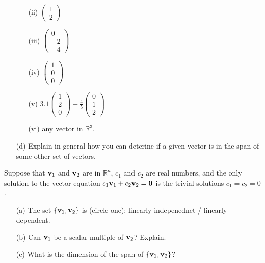 \begin{problem}
\begin{enumerate}
\begin{itemize}
                \item[(ii)] $\begin{pmatrix} 1 \\ 2 \end{pmatrix}$
                \item[(iii)] $\begin{pmatrix} 0 \\ -2 \\ -4\end{pmatrix}$
                \item[(iv)] $\begin{pmatrix} 1 \\ 0 \\ 0\end{pmatrix}$
                \item[(v)] $3.1\begin{pmatrix} 1 \\ 2 \\ 0\end{pmatrix} - \frac{4}{5}
                    \begin{pmatrix} 0 \\ 1 \\ 2 \end{pmatrix}$
                \item[(vi)] any vector in $\mathbb{R}^3$.
            \end{itemize}
        \item[(d)] Explain in general how you can deterine if a given vector is in the
            span of some other set of vectors.
    \end{enumerate}
\end{problem}

\begin{problem}
    Suppose that ${\bf v}_1$ and ${\bf v}_2$ are in $\mathbb{R}^n$, $c_1$ and $c_2$ are real
    numbers, and the only solution to the vector equation $c_1 {\bf v}_1 + c_2 {\bf v}_2 =
    {\bf 0}$ is the trivial solutions $c_1 = c_2 = 0$.
    \begin{enumerate}
        \item[(a)] The set $\{{\bf v}_1,{\bf v}_2\}$ is (circle one): linearly indepenednet /
            linearly dependent.
        \item[(b)] Can ${\bf v}_1$ be a scalar multiple of ${\bf v}_2$?  Explain.
        \item[(c)] What is the dimension of the span of $\{{\bf v}_1,{\bf v}_2\}$?
    \end{enumerate}
\end{problem}

